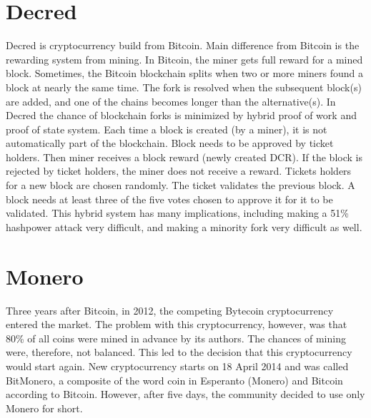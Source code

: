 \section{Decred}
Decred is cryptocurrency build from Bitcoin. Main difference from Bitcoin is the rewarding system from mining. In Bitcoin, the miner gets full reward for a mined block. Sometimes, the Bitcoin blockchain splits when two or more miners found a block at nearly the same time. The fork is resolved when the subsequent block(s) are added, and one of the chains becomes longer than the alternative(s). In Decred the chance of blockchain forks is minimized by hybrid proof of work and proof of state system. Each time a block is created (by a miner), it is not automatically part of the blockchain. Block needs to be approved by ticket holders. Then miner receives a block reward (newly created DCR). If the block is rejected by ticket holders, the miner does not receive a reward. Tickets holders for a new block are chosen randomly. The ticket validates the previous block. A block needs at least three of the five votes chosen to approve it for it to be validated.  This hybrid system has many implications, including making a 51\% hashpower attack very difficult, and making a minority fork very difficult as well.

\section{Monero}
Three years after Bitcoin, in 2012, the competing Bytecoin cryptocurrency entered the market. The problem with this cryptocurrency, however, was that 80\% of all coins were mined in advance by its authors. The chances of mining were, therefore, not balanced. This led to the decision that this cryptocurrency would start again. New cryptocurrency starts on 18 April 2014 and was called BitMonero, a composite of the word coin in Esperanto (Monero) and Bitcoin according to Bitcoin. However, after five days, the community decided to use only Monero for short.
